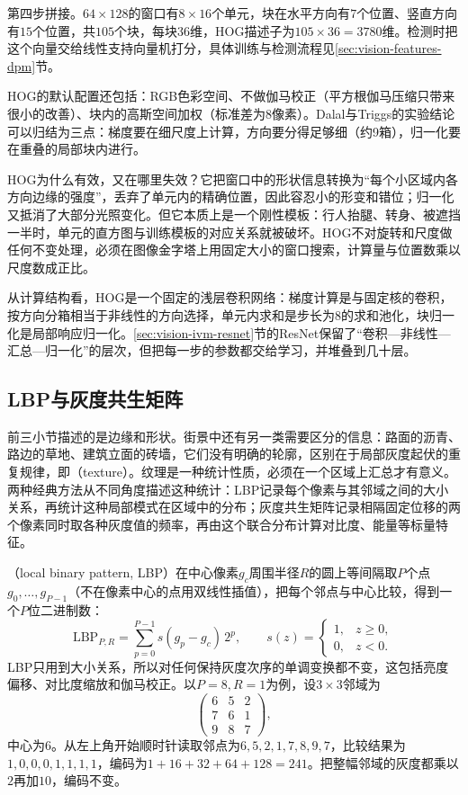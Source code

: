 第四步拼接。$64\times128$的窗口有$8\times16$个单元，块在水平方向有$7$个位置、竖直方向有$15$个位置，共$105$个块，每块36维，HOG描述子为$105\times36=3780$维。检测时把这个向量交给线性支持向量机打分，具体训练与检测流程见\ref{sec:vision-features-dpm}节。

HOG的默认配置还包括：RGB色彩空间、不做伽马校正（平方根伽马压缩只带来很小的改善）、块内的高斯空间加权（标准差为8像素）。Dalal与Triggs的实验结论可以归结为三点：梯度要在细尺度上计算，方向要分得足够细（约9箱），归一化要在重叠的局部块内进行。

HOG为什么有效，又在哪里失效？它把窗口中的形状信息转换为“每个小区域内各方向边缘的强度”，丢弃了单元内的精确位置，因此容忍小的形变和错位；归一化又抵消了大部分光照变化。但它本质上是一个刚性模板：行人抬腿、转身、被遮挡一半时，单元的直方图与训练模板的对应关系就被破坏。HOG不对旋转和尺度做任何不变处理，必须在图像金字塔上用固定大小的窗口搜索，计算量与位置数乘以尺度数成正比。

从计算结构看，HOG是一个固定的浅层卷积网络：梯度计算是与固定核的卷积，按方向分箱相当于非线性的方向选择，单元内求和是步长为8的求和池化，块归一化是局部响应归一化。\ref{sec:vision-ivm-resnet}节的ResNet保留了“卷积—非线性—汇总—归一化”的层次，但把每一步的参数都交给学习，并堆叠到几十层。

\subsection{LBP与灰度共生矩阵}
\label{sec:vision-features-texture}

前三小节描述的是边缘和形状。街景中还有另一类需要区分的信息：路面的沥青、路边的草地、建筑立面的砖墙，它们没有明确的轮廓，区别在于局部灰度起伏的重复规律，即（texture）。纹理是一种统计性质，必须在一个区域上汇总才有意义。两种经典方法从不同角度描述这种统计：LBP记录每个像素与其邻域之间的大小关系，再统计这种局部模式在区域中的分布；灰度共生矩阵记录相隔固定位移的两个像素同时取各种灰度值的频率，再由这个联合分布计算对比度、能量等标量特征。

（local binary pattern, LBP）在中心像素$g_c$周围半径$R$的圆上等间隔取$P$个点$g_0,\ldots,g_{P-1}$（不在像素中心的点用双线性插值），把每个邻点与中心比较，得到一个$P$位二进制数：
\begin{equation}
  \mathrm{LBP}_{P,R}=\sum_{p=0}^{P-1}s(g_p-g_c)\,2^p,\qquad
  s(z)=\begin{cases}1,&z\geq0,\\0,&z<0.\end{cases}
  \label{eq:vision-features-lbp}
\end{equation}
LBP只用到大小关系，所以对任何保持灰度次序的单调变换都不变，这包括亮度偏移、对比度缩放和伽马校正。以$P=8,R=1$为例，设$3\times3$邻域为
\[
  \begin{pmatrix}6&5&2\\7&6&1\\9&8&7\end{pmatrix},
\]
中心为$6$。从左上角开始顺时针读取邻点为$6,5,2,1,7,8,9,7$，比较结果为$1,0,0,0,1,1,1,1$，编码为$1+16+32+64+128=241$。把整幅邻域的灰度都乘以$2$再加$10$，编码不变。

